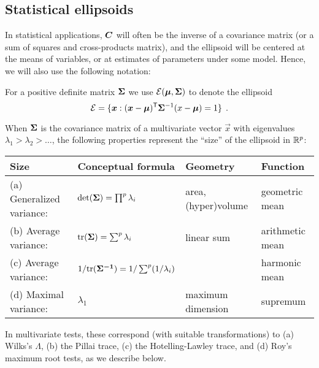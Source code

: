 \subsection{Statistical ellipsoids}

In statistical applications, $\bm{C}$ will often be the inverse of a covariance
matrix (or a sum of squares and cross-products matrix), and the ellipsoid will
be centered at the means of variables, or at estimates of parameters under some model.
Hence, we will also use the following notation:

For a positive definite matrix
$\bm{\Sigma}$ we use $\mathcal{E}(\bm{\mu},\bm{\Sigma})$ to denote the ellipsoid
\begin{equation}\label{eq:ellipsoid3}
\mathcal{E} = \{ \bm{x} : (\bm{x}-\bm{\mu})^\mathsf{T} \bm{\Sigma}^{-1} (x-\bm{\mu}) = 1 \} \:\: .
 \end{equation}

When $\bm{\Sigma}$ is the covariance matrix of a multivariate vector $\vec{x}$ with eigenvalues
$\lambda_1 > \lambda_2 > \dots$,
the following
properties represent the ``size'' of the ellipsoid in $\mathbb{R}^{p}$:

\begin{tabular}{llll}
    Size                   &  Conceptual formula                    & Geometry       & Function \\
\hline
(a) Generalized variance:  & $\mathrm{det} (\bm{\Sigma}) = \prod^p \lambda_i$ & area, (hyper)volume & geometric mean\\
(b) Average variance:        & $\mathrm{tr} (\bm{\bm{\Sigma}}) = \sum^p \lambda_i $ & linear sum & arithmetic mean\\
(c) Average variance:        & $1/ \mathrm{tr} (\bm{\bm{\Sigma}^{-1}}) = 1/\sum^p (1/\lambda_i) $ &  & harmonic mean\\
(d) Maximal variance:      & $\lambda_1$ & maximum dimension & supremum
 \end{tabular}
\medskip

\noindent In multivariate tests, these correspond (with suitable transformations) to (a) Wilks's $\Lambda$,
(b) the Pillai trace, (c) the Hotelling-Lawley  trace,  and (d) Roy's maximum root tests, as we describe
below.

